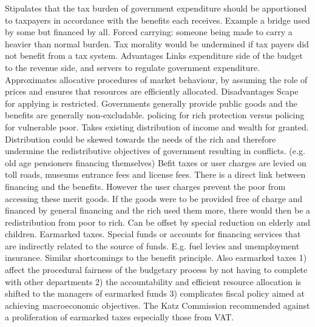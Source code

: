 \documentclass[12pt]{examnotes}
\begin{document}
\ra Stipulates that the tax burden of government expenditure should be apportioned to taxpayers in accordance with the benefits each receives.
\ra Example a bridge used by some but financed by all.
\ra Forced carrying: someone being made to carry a heavier than normal burden.
\ra Tax morality would be undermined if tax payers did not benefit from a tax system.
\ra Advantages
 Links expenditure side of the budget to the revenue side, and servers to regulate government expenditure.
 Approximates allocative procedures of market behaviour, by assuming the role of prices and ensures that resources are efficiently allocated.
\ra Disadvantages
 Scape for applying is restricted. Governments generally provide public goods and the benefits are generally non-excludable. policing for rich protection versus policing for vulnerable poor.
 Takes existing distribution of income and wealth for granted. Distribution could be skewed towards the needs of the rich and therefore undermine the redistributive objectives of government resulting in conflicts. (e.g. old age pensioners financing themselves)
\ra  Befit taxes or user charges are levied on toll roads, museums entrance fees and license fees. There is a direct link between financing and the benefits. However the user charges prevent the poor from accessing these merit goods.  If the goods were to be provided free of charge and financed by general financing and the rich used them more, there would then be a redistribution from poor to rich. Can be offset by special reduction on elderly and children. 
\ra Earmarked taxes. Special funds or accounts for financing services that are indirectly related to the source of funds. E.g. fuel levies and unemployment insurance. Similar shortcomings to the benefit principle. Also earmarked taxes 1) affect the procedural fairness of the budgetary process by not having to complete with other departments 2) the accountability and efficient resource allocation is shifted to the managers of earmarked funds 3) complicates fiscal policy aimed at achieving macroeconomic objectives. The Katz Commission recommended against a proliferation of earmarked taxes especially those from VAT.
\end{document}
